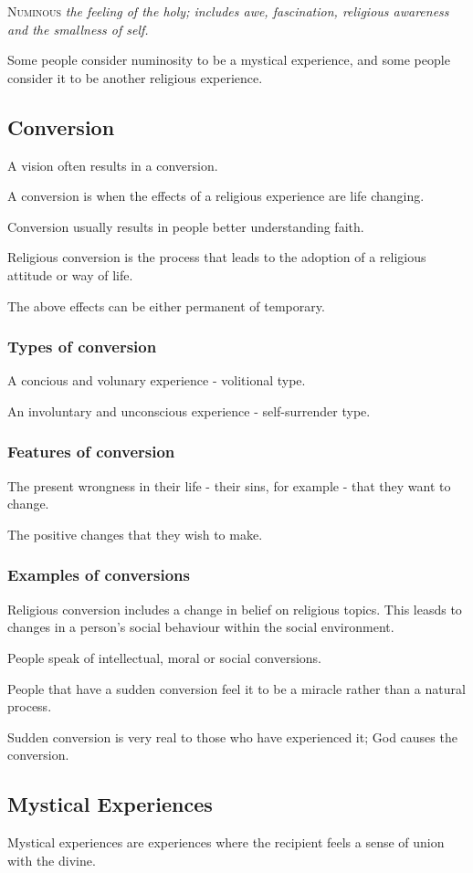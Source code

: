 \documentclass{article}
\begin{document}
\textsc{Numinous} \textit{the feeling of the holy; includes awe, fascination, religious awareness and the smallness of self.}

Some people consider numinosity to be a mystical experience, and some people consider it to be another religious experience.

\subsection*{Conversion}

A vision often results in a conversion.

A conversion is when the effects of a religious experience are life changing.

Conversion usually results in people better understanding faith.

Religious conversion is the process that leads to the adoption of a religious attitude or way of life.

The above effects can be either permanent of temporary.

\subsubsection*{Types of conversion}

A concious and volunary experience - volitional type.

An involuntary and unconscious experience - self-surrender type.

\subsubsection*{Features of conversion}

The present wrongness in their life - their sins, for example - that they want to change.

The positive changes that they wish to make.

\subsubsection*{Examples of conversions}

Religious conversion includes a change in belief on religious topics.  This leasds to changes in a person's social behaviour within the social environment.

People speak of intellectual, moral or social conversions.

People that have a sudden conversion feel it to be a miracle rather than a natural process.

Sudden conversion is very real to those who have experienced it; God causes the conversion.

\subsection*{Mystical Experiences}

Mystical experiences are experiences where the recipient feels a sense of union with the divine.
\end{document}
